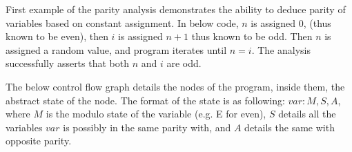 First example of the parity analysis demonstrates the ability to deduce parity of variables based on constant assignment. In below code, $n$ is assigned 0, (thus known to be even), then $i$ is assigned $n+1$ thus known to be odd. Then $n$ is assigned a random value, and program iterates until $n = i$. The analysis successfully asserts that both $n$ and $i$ are odd. 

The below control flow graph details the nodes of the program, inside them, the abstract state of the node. The format of the state is as following: $var: M, S, A$, where $M$ is the modulo state of the variable (e.g. E for even), $S$ details all the variables $var$ is possibly in the same parity with, and $A$ details the same with opposite parity. 
